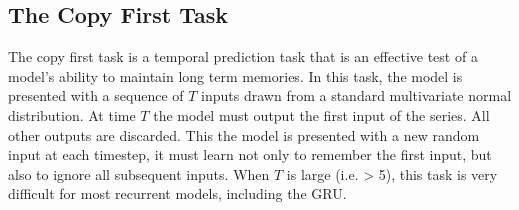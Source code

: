 \subsection*{The Copy First Task}

The copy first task is a temporal prediction task that is an effective test of a model's ability to maintain long term memories. In this task, the model is presented with a sequence of \(T\) inputs drawn from a standard multivariate normal distribution. At time \(T\) the model must output the first input of the series. All other outputs are discarded. This the model is presented with a new random input at each timestep, it must learn not only to remember the first input, but also to ignore all subsequent inputs. When \(T\) is large (i.e. > 5), this task is very difficult for most recurrent models, including the GRU.
